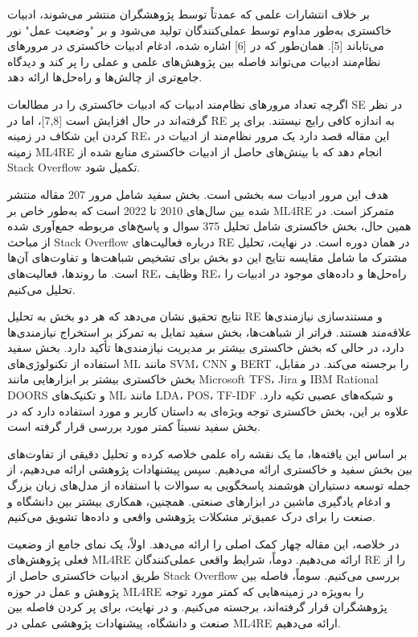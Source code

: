\documentclass[a4paper,10pt]{article}
\begin{document}
    بر خلاف انتشارات علمی که عمدتاً توسط پژوهشگران منتشر می‌شوند، ادبیات خاکستری به‌طور مداوم توسط عملی‌کنندگان تولید می‌شود و بر "وضعیت عمل" نور می‌تاباند [5]. همان‌طور که در [6] اشاره شده، ادغام ادبیات خاکستری در مرورهای نظام‌مند ادبیات می‌تواند فاصله بین پژوهش‌های علمی و عملی را پر کند و دیدگاه جامع‌تری از چالش‌ها و راه‌حل‌ها ارائه دهد.

    اگرچه تعداد مرورهای نظام‌مند ادبیات که ادبیات خاکستری را در مطالعات SE در نظر گرفته‌اند در حال افزایش است [7,8]، اما در RE به اندازه کافی رایج نیستند. برای پر کردن این شکاف در زمینه RE، این مقاله قصد دارد یک مرور نظام‌مند از ادبیات در زمینه ML4RE انجام دهد که با بینش‌های حاصل از ادبیات خاکستری منابع شده از Stack Overflow تکمیل شود.

    هدف این مرور ادبیات سه بخشی است. بخش سفید شامل مرور 207 مقاله منتشر شده بین سال‌های 2010 تا 2022 است که به‌طور خاص بر ML4RE متمرکز است. در همین حال، بخش خاکستری شامل تحلیل 375 سوال و پاسخ‌های مربوطه جمع‌آوری شده از مباحث Stack Overflow درباره فعالیت‌های RE در همان دوره است. در نهایت، تحلیل مشترک ما شامل مقایسه نتایج این دو بخش برای تشخیص شباهت‌ها و تفاوت‌های آن‌ها است. ما روندها، فعالیت‌های RE، وظایف RE، راه‌حل‌ها و داده‌های موجود در ادبیات را تحلیل می‌کنیم.

    نتایج تحقیق نشان می‌دهد که هر دو بخش به تحلیل RE و مستندسازی نیازمندی‌ها علاقه‌مند هستند. فراتر از شباهت‌ها، بخش سفید تمایل به تمرکز بر استخراج نیازمندی‌ها دارد، در حالی که بخش خاکستری بیشتر بر مدیریت نیازمندی‌ها تأکید دارد. بخش سفید استفاده از تکنولوژی‌های ML مانند SVM، CNN و BERT را برجسته می‌کند. در مقابل، بخش خاکستری بیشتر بر ابزارهایی مانند Microsoft TFS، Jira و IBM Rational DOORS و تکنیک‌های ML مانند LDA، POS، TF-IDF و شبکه‌های عصبی تکیه دارد. علاوه بر این، بخش خاکستری توجه ویژه‌ای به داستان کاربر و مورد استفاده دارد که در بخش سفید نسبتاً کمتر مورد بررسی قرار گرفته است.

    بر اساس این یافته‌ها، ما یک نقشه راه علمی خلاصه کرده و تحلیل دقیقی از تفاوت‌های بین بخش سفید و خاکستری ارائه می‌دهیم. سپس پیشنهادات پژوهشی ارائه می‌دهیم، از جمله توسعه دستیاران هوشمند پاسخگویی به سوالات با استفاده از مدل‌های زبان بزرگ و ادغام یادگیری ماشین در ابزارهای صنعتی. همچنین، همکاری بیشتر بین دانشگاه و صنعت را برای درک عمیق‌تر مشکلات پژوهشی واقعی و داده‌ها تشویق می‌کنیم.

    در خلاصه، این مقاله چهار کمک اصلی را ارائه می‌دهد. اولاً، یک نمای جامع از وضعیت فعلی پژوهش‌های ML4RE ارائه می‌دهیم. دوماً، شرایط واقعی عملی‌کنندگان RE را از طریق ادبیات خاکستری حاصل از Stack Overflow بررسی می‌کنیم. سوماً، فاصله بین پژوهش و عمل در حوزه ML4RE را به‌ویژه در زمینه‌هایی که کمتر مورد توجه پژوهشگران قرار گرفته‌اند، برجسته می‌کنیم. و در نهایت، برای پر کردن فاصله بین صنعت و دانشگاه، پیشنهادات پژوهشی عملی در ML4RE ارائه می‌دهیم.
\end{document}
